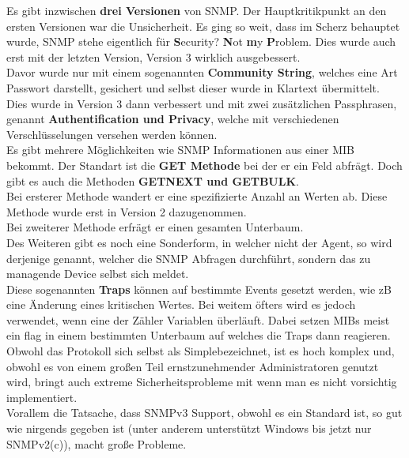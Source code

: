 \documentclass[12pt,a4paper]{report}
\begin{document}
Es gibt inzwischen \textbf{drei Versionen} von SNMP. Der Hauptkritikpunkt an den ersten Versionen war die Unsicherheit. Es ging so weit, dass im Scherz behauptet wurde, SNMP stehe eigentlich für \textbf{S}ecurity? \textbf{N}ot \textbf{m}y \textbf{P}roblem. Dies wurde auch erst mit der letzten Version, Version 3 wirklich ausgebessert.\\
Davor wurde nur mit einem sogenannten \textbf{Community String}, welches eine Art Passwort darstellt, gesichert und selbst dieser wurde in Klartext übermittelt.\\
Dies wurde in Version 3 dann verbessert und mit zwei zusätzlichen Passphrasen, genannt \textbf{Authentification und Privacy}, welche mit verschiedenen Verschlüsselungen versehen werden können.\\

Es gibt mehrere Möglichkeiten wie SNMP Informationen aus einer MIB bekommt. Der Standart ist die \textbf{GET Methode} bei der er ein Feld abfrägt. Doch gibt es auch die Methoden \textbf{GETNEXT und GETBULK}.\\
Bei ersterer Methode wandert er eine spezifizierte Anzahl an Werten ab. Diese Methode wurde erst in Version 2 dazugenommen.\\
Bei zweiterer Methode erfrägt er einen gesamten Unterbaum.\\

Des Weiteren gibt es noch eine Sonderform, in welcher nicht der Agent, so wird derjenige genannt, welcher die SNMP Abfragen durchführt, sondern das zu managende Device selbst sich meldet.\\
Diese sogenannten \textbf{Traps} können auf bestimmte Events gesetzt werden, wie zB eine Änderung eines kritischen Wertes. Bei weitem öfters wird es jedoch verwendet, wenn eine der Zähler Variablen überläuft. Dabei setzen MIBs meist ein flag in einem bestimmten Unterbaum auf welches die Traps dann reagieren.\\

Obwohl das Protokoll sich selbst als \glqq Simple\grqq bezeichnet, ist es hoch komplex und, obwohl es von einem großen Teil ernstzunehmender Administratoren genutzt wird, bringt auch extreme Sicherheitsprobleme mit wenn man es nicht vorsichtig implementiert.\\
Vorallem die Tatsache, dass SNMPv3 Support, obwohl es ein Standard ist, so gut wie nirgends gegeben ist (unter anderem unterstützt Windows bis jetzt nur SNMPv2(c)), macht große Probleme. 
\end{document}
